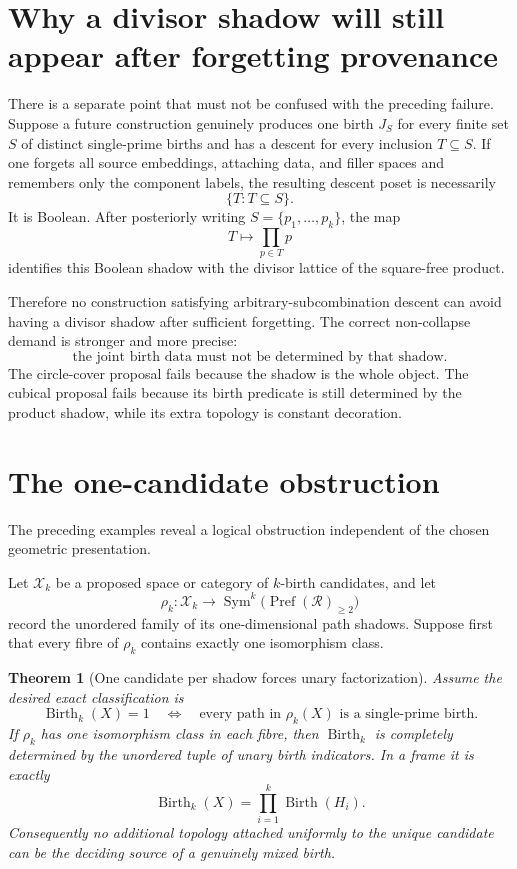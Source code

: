 \documentclass[11pt]{article}
\newtheorem{theorem}{Theorem}[section]
\newcommand{\Pref}{\operatorname{Pref}}
\newcommand{\Birth}{\operatorname{Birth}}
\begin{document}
\section{Why a divisor shadow will still appear after forgetting provenance}

There is a separate point that must not be confused with the preceding
failure.  Suppose a future construction genuinely produces one birth
\(J_S\) for every finite set \(S\) of distinct single-prime births and has a
descent for every inclusion \(T\subseteq S\).  If one forgets all source
embeddings, attaching data, and filler spaces and remembers only the component
labels, the resulting descent poset is necessarily
\[
\{T:T\subseteq S\}.
\]
It is Boolean.  After posteriorly writing
\(S=\{p_1,\ldots,p_k\}\), the map
\[
T\longmapsto\prod_{p\in T}p
\]
identifies this Boolean shadow with the divisor lattice of the square-free
product.

Therefore no construction satisfying arbitrary-subcombination descent can
avoid having a divisor shadow after sufficient forgetting.  The correct
non-collapse demand is stronger and more precise:
\[
\boxed{
\text{the joint birth data must not be determined by that shadow.}
}
\]
The circle-cover proposal fails because the shadow is the whole object.  The
cubical proposal fails because its birth predicate is still determined by the
product shadow, while its extra topology is constant decoration.

\section{The one-candidate obstruction}

The preceding examples reveal a logical obstruction independent of the chosen
geometric presentation.

Let \(\mathcal X_k\) be a proposed space or category of \(k\)-birth
candidates, and let
\[
\rho_k:\mathcal X_k\longrightarrow
\operatorname{Sym}^k\bigl(\Pref(\mathscr R)_{\ge2}\bigr)
\]
record the unordered family of its one-dimensional path shadows.  Suppose
first that every fibre of \(\rho_k\) contains exactly one isomorphism class.

\begin{theorem}[One candidate per shadow forces unary factorization]
\label{thm:one-candidate}
Assume the desired exact classification is
\[
\Birth_k(X)=1
\quad\Longleftrightarrow\quad
\text{every path in }\rho_k(X)\text{ is a single-prime birth}.
\]
If \(\rho_k\) has one isomorphism class in each fibre, then \(\Birth_k\) is
completely determined by the unordered tuple of unary birth indicators.  In a
frame it is exactly
\[
\boxed{
\Birth_k(X)
=
\prod_{i=1}^k\Birth(H_i).
}
\]
Consequently no additional topology attached uniformly to the unique
candidate can be the deciding source of a genuinely mixed birth.
\end{theorem}
\end{document}
